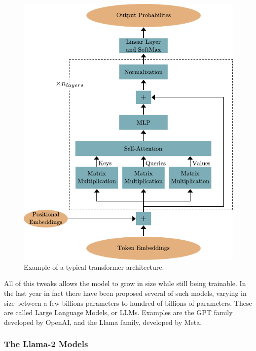 \documentclass[]{marticle}
\begin{document}
\begin{figure}[!tb] 
\begin{center}
\includegraphics{transformer_architecture.pdf}
\caption{Example of a typical transformer architecture.} 
\label{fig:transformer-architecture} 
\end{center}
\end{figure}

All of this tweaks allows the model to grow in size while still being trainable. In the last year in
fact there have been proposed several of such models, varying in size between a few billions
parameters to hundred of billions of parameters. These are called Large Language Models, or LLMs.
Examples are the GPT family developed by OpenAI, and the Llama family, developed by Meta.

\subsubsection{The Llama-2 Models}
\end{document}
